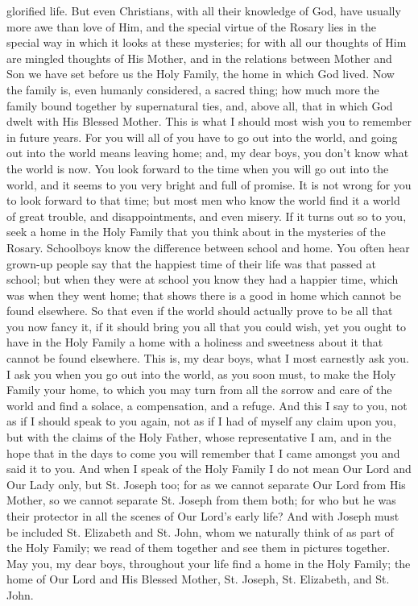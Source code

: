glorified life. But even Christians, with all their knowledge of God,
have usually more awe than love of Him, and the special virtue of the
Rosary lies in the special way in which it looks at these mysteries;
for with all our thoughts of Him are mingled thoughts of His Mother,
and in the relations between Mother and Son we have set before us the
Holy Family, the home in which God lived. Now the family is, even
humanly considered, a sacred thing; how much more the family bound
together by supernatural ties, and, above all, that in which God dwelt
with His Blessed Mother. This is what I should most wish you to
remember in future years. For you will all of you have to go out into
the world, and going out into the world means leaving home; and, my
dear boys, you don't know what the world is now. You look forward to
the time when you will go out into the world, and it seems to you very
bright and full of promise. It is not wrong for you to look forward to
that time; but most men who know the world find it a world of great
trouble, and disappointments, and even misery. If it turns out so to
you, seek a home in the Holy Family that you think about in the
mysteries of the Rosary. Schoolboys know the difference between school
and home. You often hear grown-up people say that the happiest time of
their life was that passed at school; but when they were at school you
know they had a happier time, which was when they went home; that
shows there is a good in home which cannot be found elsewhere. So that
even if the world should actually prove to be all that you now fancy
it, if it should bring you all that you could wish, yet you ought to
have in the Holy Family a home with a holiness and sweetness about it
that cannot be found elsewhere. This is, my dear boys, what I most
earnestly ask you. I ask you when you go out into the world, as you
soon must, to make the Holy Family your home, to which you may turn
from all the sorrow and care of the world and find a solace, a
compensation, and a refuge. And this I say to you, not as if I should
speak to you again, not as if I had of myself any claim upon you, but
with the claims of the Holy Father, whose representative I am, and in
the hope that in the days to come you will remember that I came
amongst you and said it to you. And when I speak of the Holy Family I
do not mean Our Lord and Our Lady only, but St. Joseph too; for as we
cannot separate Our Lord from His Mother, so we cannot separate St.
Joseph from them both; for who but he was their protector in all the
scenes of Our Lord's early life? And with Joseph must be included
St. Elizabeth and St. John, whom we naturally think of as part of the
Holy Family; we read of them together and see them in pictures
together. May you, my dear boys, throughout your life find a home in
the Holy Family; the home of Our Lord and His Blessed Mother, St.
Joseph, St. Elizabeth, and St. John.

